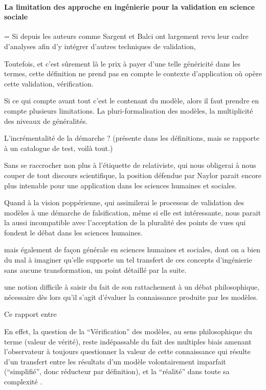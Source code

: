 \paragraph{La limitation des approche en ingénierie pour la validation en science sociale}

= Si depuis les auteurs comme Sargent et Balci ont largement revu leur cadre d'analyses afin d'y intégrer d'autres techniques de validation,

Toutefois, et c'est sûrement là le prix à payer d'une telle généricité dans les termes, cette définition ne prend pas en compte le contexte d'application où opère cette validation, vérification.

Si ce qui compte avant tout c'est le contenant du modèle, alors il faut prendre en compte plusieurs limitations. La pluri-formalisation des modèles, la multiplicité des niveaux de généralités.

L'incrémentalité de la démarche ? (présente dans les définitions, mais se rapporte à un catalogue de test, voilà tout.)

Sans se raccrocher non plus à l'étiquette de relativiste, qui nous obligerai à nous couper de tout discours scientifique, la position défendue par Naylor parait encore plus intenable pour une application dans les sciences humaines et sociales.

Quand à la vision poppérienne, qui assimilerai le processus de validation des modèles à une démarche de falsification, même si elle est intéressante, nous parait la aussi incompatible avec l'acceptation de la pluralité des points de vues qui fondent le débat dans les sciences humaines.


mais également de façon générale en sciences humaines et sociales, dont on a bien du mal à imaginer qu'elle supporte un tel transfert de ces concepts d’ingénierie sans aucune transformation, un point détaillé par la suite.




une notion difficile à saisir du fait de son rattachement à un débat philosophique, nécessaire dès lors qu'il s'agit d'évaluer la connaissance produite par les modèles.

Ce rapport entre

En effet, la question de la \enquote{Vérification} des modèles, au sens philosophique du terme (valeur de vérité), reste indépassable du fait des multiples biais amenant l'observateur à toujours questionner la valeur de cette connaissance qui résulte d'un transfert entre les résultats d'un modèle volontairement imparfait (\enquote{simplifié}, donc réducteur par définition), et la \enquote{réalité} dans toute sa complexité \autocite{OSullivan2004}.

